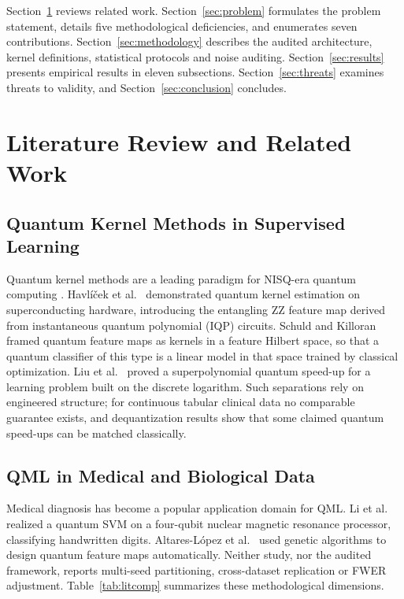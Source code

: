 \documentclass[journal,twocolumn]{IEEEtran}
\begin{document}
Section~\ref{sec:litreview} reviews related work. Section~\ref{sec:problem} formulates the problem statement, details five methodological deficiencies, and enumerates seven contributions. Section~\ref{sec:methodology} describes the audited architecture, kernel definitions, statistical protocols and noise auditing. Section~\ref{sec:results} presents empirical results in eleven subsections. Section~\ref{sec:threats} examines threats to validity, and Section~\ref{sec:conclusion} concludes.

\section{Literature Review and Related Work}
\label{sec:litreview}

\subsection{Quantum Kernel Methods in Supervised Learning}

Quantum kernel methods are a leading paradigm for NISQ-era quantum computing \cite{havlicek2019supervised,schuld2019quantum}. Havl{\'i}{\v c}ek et al.\ \cite{havlicek2019supervised} demonstrated quantum kernel estimation on superconducting hardware, introducing the entangling ZZ feature map derived from instantaneous quantum polynomial (IQP) circuits. Schuld and Killoran \cite{schuld2019quantum} framed quantum feature maps as kernels in a feature Hilbert space, so that a quantum classifier of this type is a linear model in that space trained by classical optimization. Liu et al.\ \cite{liu2021rigorous} proved a superpolynomial quantum speed-up for a learning problem built on the discrete logarithm. Such separations rely on engineered structure; for continuous tabular clinical data no comparable guarantee exists, and dequantization results \cite{tang2019quantum} show that some claimed quantum speed-ups can be matched classically.

\subsection{QML in Medical and Biological Data}

Medical diagnosis has become a popular application domain for QML. Li et al.\ \cite{li2015experimental} realized a quantum SVM on a four-qubit nuclear magnetic resonance processor, classifying handwritten digits. Altares-L{\'o}pez et al.\ \cite{altares2021automatic} used genetic algorithms to design quantum feature maps automatically. Neither study, nor the audited framework, reports multi-seed partitioning, cross-dataset replication or FWER adjustment. Table~\ref{tab:litcomp} summarizes these methodological dimensions.
\end{document}
